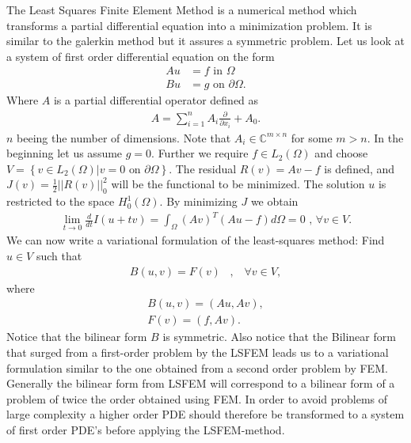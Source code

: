 The Least Squares Finite Element Method is a numerical method which transforms a partial differential equation into a minimization problem. It is similar to the galerkin method but it assures a symmetric problem. Let us look at a system of first order differential equation on the form 
\begin{align}
	Au &= f \text{ in } \Omega \\
	Bu &= g \text{ on } \partial \Omega.
	\label{eq:PDE}
\end{align}
Where $A$ is a partial differential operator defined as 
\begin{align}
	A = \sum_{i = 1}^{n} A_i\frac{\partial}{\partial x_i} + A_0.
	\label{def:operatorA}
\end{align}
$n$ beeing the number of dimensions. Note that $A_i \in \mathbb{C}^{m \times n}$ for some $m>n$. In the beginning let us assume $g=0$. Further we require $f \in L_2(\Omega)$ and choose $V = \left\{ v\in L_2(\Omega) | v = 0 \text{ on } \partial \Omega \right\}$. The residual $R(v) = Av-f$ is defined, and $J(v) = \frac{1}{2}||R(v)||^2_0 $ will be the functional to be minimized. The solution $u$ is restricted to the space $H^1_0(\Omega)$. By minimizing $J$ we obtain 
\begin{align}
	\lim_{t\rightarrow 0} \frac{d}{dt}I(u+tv) = \int_{\Omega}(Av)^T(Au-f)d\Omega = 0 \text{    ,   } \forall v \in V.
	\label{eq:minProb}
\end{align}
We can now write a variational formulation of the least-squares method: Find $u \in V$ such that 
\begin{align}
	B(u,v) = F(v) \; \; \; , \; \; \; \forall v \in V,
	\label{def:varForm}
\end{align}
where
\begin{align}
	B(u,v) = (Au,Av), \\
	F(v) = (f,Av).
	\label{def:bilin}
\end{align}
Notice that the bilinear form $B$ is symmetric. Also notice that the Bilinear form that surged from a first-order problem by the LSFEM leads us to a variational formulation similar to the one obtained from a second order problem by FEM. Generally the bilinear form from LSFEM will correspond to a bilinear form of a problem of twice the order obtained using FEM. In order to avoid problems of large complexity a higher order PDE should therefore be transformed to a system of first order PDE's before applying the LSFEM-method. 

